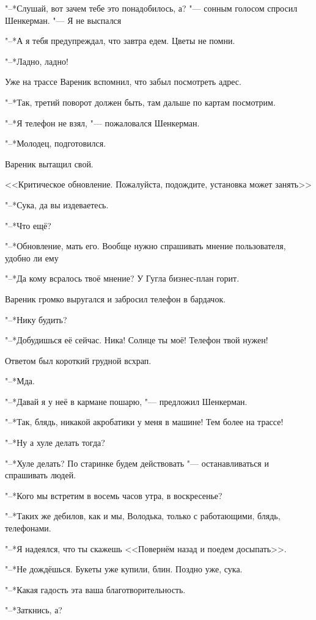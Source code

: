 "--*Слушай, вот зачем тебе это понадобилось, а? "--- сонным голосом спросил Шенкерман.
"--- Я не выспался\ldotst

"--*А я тебя предупреждал, что завтра едем.
Цветы не помни.

"--*Ладно, ладно!

Уже на трассе Вареник вспомнил, что забыл посмотреть адрес.

"--*Так, третий поворот должен быть, там дальше по картам посмотрим.

"--*Я телефон не взял, "--- пожаловался Шенкерман.

"--*Молодец, подготовился.

Вареник вытащил свой.

<<Критическое обновление.
Пожалуйста, подождите, установка может занять\ldotst>>

"--*Сука, да вы издеваетесь.

"--*Что ещё?

"--*Обновление, мать его.
Вообще нужно спрашивать мнение пользователя, удобно ли ему\ldotst

"--*Да кому всралось твоё мнение?
У Гугла бизнес-план горит.

Вареник громко выругался и забросил телефон в бардачок.

"--*Нику будить?

"--*Добудишься её сейчас.
Ника!
Солнце ты моё!
Телефон твой нужен!

Ответом был короткий грудной всхрап.

"--*Мда.

"--*Давай я у неё в кармане пошарю, "--- предложил Шенкерман.

"--*Так, блядь, никакой акробатики у меня в машине!
Тем более на трассе!

"--*Ну а хуле делать тогда?

"--*Хуле делать?
По старинке будем действовать "--- останавливаться и спрашивать людей.

"--*Кого мы встретим в восемь часов утра, в воскресенье?

"--*Таких же дебилов, как и мы, Володька, только с работающими, блядь, телефонами.

"--*Я надеялся, что ты скажешь <<Повернём назад и поедем досыпать>>.

"--*Не дождёшься.
Букеты уже купили, блин.
Поздно уже, сука.

"--*Какая гадость эта ваша благотворительность.

"--*Заткнись, а?

